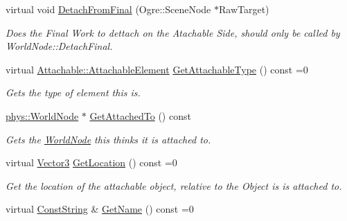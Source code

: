\begin{DoxyCompactItemize}
virtual void \hyperlink{classphys_1_1Attachable_a3e4d8113c4b45ece63c29180cf96029a}{DetachFromFinal} (Ogre::SceneNode $\ast$RawTarget)
\begin{DoxyCompactList}\small\item\em Does the Final Work to dettach on the Atachable Side, should only be called by WorldNode::DetachFinal. \item\end{DoxyCompactList}\item 
virtual \hyperlink{classphys_1_1Attachable_acd1fca033e7cc0bb3024a92d466d213a}{Attachable::AttachableElement} \hyperlink{classphys_1_1Attachable_a1c84342fe19d8eef33de4789e19c9d00}{GetAttachableType} () const =0
\begin{DoxyCompactList}\small\item\em Gets the type of element this is. \item\end{DoxyCompactList}\item 
\hyperlink{classphys_1_1WorldNode}{phys::WorldNode} $\ast$ \hyperlink{classphys_1_1Attachable_a6df6034ed61c98d350378bdd7a3129f6}{GetAttachedTo} () const 
\begin{DoxyCompactList}\small\item\em Gets the \hyperlink{classphys_1_1WorldNode}{WorldNode} this thinks it is attached to. \item\end{DoxyCompactList}\item 
virtual \hyperlink{classphys_1_1Vector3}{Vector3} \hyperlink{classphys_1_1Attachable_acb410686b2719524eb484b50cc9054a4}{GetLocation} () const =0
\begin{DoxyCompactList}\small\item\em Get the location of the attachable object, relative to the Object is is attached to. \item\end{DoxyCompactList}\item 
\hypertarget{classphys_1_1Attachable_a0a07d727fa2630dc3550fd991ca28256}{
virtual \hyperlink{namespacephys_a5ce5049f8b4bf88d6413c47b504ebb31}{ConstString} \& \hyperlink{classphys_1_1Attachable_a0a07d727fa2630dc3550fd991ca28256}{GetName} () const =0}
\label{classphys_1_1Attachable_a0a07d727fa2630dc3550fd991ca28256}


\end{DoxyCompactItemize}
